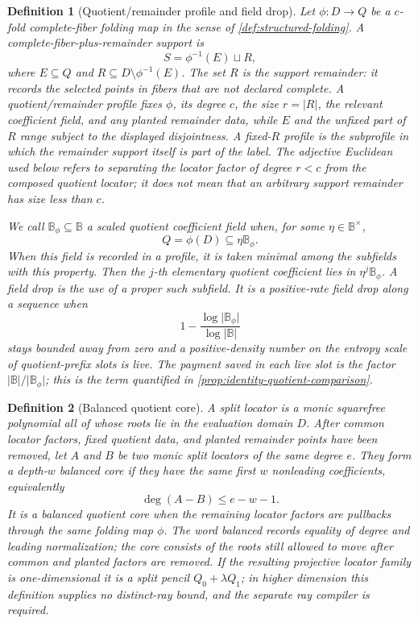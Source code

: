 \documentclass[12pt,a4paper]{amsart}
\numberwithin{equation}{section}
\newtheorem{definition}[definition]{Definition}
\theoremstyle{remark}
\newcommand{\B}{\mathbb B}
\newcommand{\abs}[1]{\lvert #1\rvert}
\begin{document}
\begin{definition}[Quotient/remainder profile and field drop]
\label{def:quotient-remainder-profile}
Let \(\phi:D\to Q\) be a \(c\)-fold complete-fiber folding map in the
sense of \cref{def:structured-folding}.  A
\emph{complete-fiber-plus-remainder support} is
\[
                  S=\phi^{-1}(E)\sqcup R,
\]
where \(E\subseteq Q\) and
\(R\subseteq D\setminus\phi^{-1}(E)\).  The set \(R\) is the
\emph{support remainder}: it records the selected points in fibers that
are not declared complete.  A \emph{quotient/remainder profile} fixes
\(\phi\), its degree \(c\), the size \(r=\abs R\), the relevant
coefficient field, and any planted remainder data, while \(E\) and the
unfixed part of \(R\) range subject to the displayed disjointness.
A fixed-\(R\) profile is the subprofile in which the remainder support
itself is part of the label.  The adjective \emph{Euclidean} used below
refers to separating the locator factor of degree \(r<c\) from the
composed quotient locator; it does not mean that an arbitrary support
remainder has size less than \(c\).

We call \(\B_\phi\subseteq\B\) a \emph{scaled quotient coefficient
field} when, for some \(\eta\in\B^\times\),
\[
                         Q=\phi(D)\subseteq\eta\B_\phi .
\]
When this field is recorded in a profile, it is taken minimal among the
subfields with this property.
Then the \(j\)-th elementary quotient coefficient lies in
\(\eta^j\B_\phi\).  A \emph{field drop} is the use of a proper such
subfield.  It is a \emph{positive-rate field drop} along a sequence when
\[
       1-\frac{\log\abs{\B_\phi}}{\log\abs\B}
\]
stays bounded away from zero and a positive-density number on the
entropy scale of quotient-prefix slots is live.  The payment saved in
each live slot is the factor \(\abs\B/\abs{\B_\phi}\); this is the term
quantified in \cref{prop:identity-quotient-comparison}.
\end{definition}

\begin{definition}[Balanced quotient core]
\label{def:balanced-quotient-core}
A \emph{split locator} is a monic squarefree polynomial all of whose roots
lie in the evaluation domain \(D\).
After common locator factors, fixed quotient data, and planted remainder
points have been removed, let \(A\) and \(B\) be two monic split
locators of the same degree \(e\).  They form a
\emph{depth-\(w\) balanced core} if they have the same first \(w\)
nonleading coefficients, equivalently
\[
                         \deg(A-B)\le e-w-1.
\]
It is a \emph{balanced quotient core} when the remaining locator factors
are pullbacks through the same folding map \(\phi\).  The word
\emph{balanced} records equality of degree and leading normalization;
the \emph{core} consists of the roots still allowed to move after common
and planted factors are removed.  If the resulting projective locator
family is one-dimensional it is a split pencil
\(Q_0+\lambda Q_1\); in higher dimension this definition supplies no
distinct-ray bound, and the separate ray compiler is required.
\end{definition}
\end{document}
